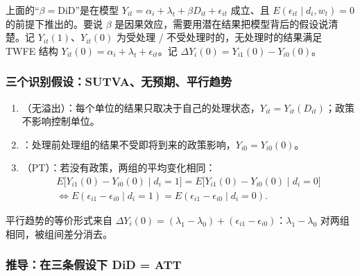 上面的“$\beta=\text{DiD}$”是在模型 $Y_{it}=\alpha_i+\lambda_t+\beta D_{it}+\epsilon_{it}$ 成立、且 $E(\epsilon_{it}\mid d_i,w_t)=0$ 的前提下推出的。要说 $\beta$ 是因果效应，需要用潜在结果把模型背后的假设说清楚。记 $Y_{it}(1)$、$Y_{it}(0)$ 为受处理 / 不受处理时的，无处理时的结果满足 TWFE 结构 $Y_{it}(0)=\alpha_i+\lambda_t+\epsilon_{it}$。记 $\Delta Y_i(0)=Y_{i1}(0)-Y_{i0}(0)$。

\subsubsection{三个识别假设：SUTVA、无预期、平行趋势}

\begin{defn}\label{def:U17b-assump}
\begin{enumerate}
  \item {}（无溢出）：每个单位的结果只取决于自己的处理状态，$Y_{it}=Y_{it}(D_{it})$；政策不影响控制单位。
  \item {}：处理前处理组的结果不受即将到来的政策影响，$Y_{i0}=Y_{i0}(0)$。
  \item {}（PT）：若没有政策，两组的平均变化相同：
  \begin{gather*}
  E\bigl[Y_{i1}(0)-Y_{i0}(0)\mid d_i=1\bigr]=E\bigl[Y_{i1}(0)-Y_{i0}(0)\mid d_i=0\bigr]\\
  \iff E(\epsilon_{i1}-\epsilon_{i0}\mid d_i=1)=E(\epsilon_{i1}-\epsilon_{i0}\mid d_i=0).
  \end{gather*}
\end{enumerate}
\end{defn}
平行趋势的等价形式来自 $\Delta Y_i(0)=(\lambda_1-\lambda_0)+(\epsilon_{i1}-\epsilon_{i0})$：$\lambda_1-\lambda_0$ 对两组相同，被组间差分消去。

\subsubsection{推导：在三条假设下 DiD = ATT}

